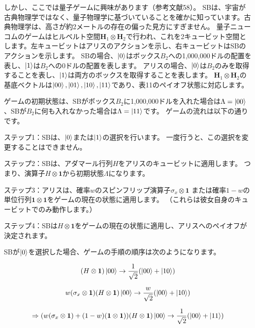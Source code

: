 しかし、ここでは量子ゲームに興味があります（参考文献58）。
SBは、宇宙が古典物理学ではなく、量子物理学に基づいていることを確かに知っています。古典物理学は、高さが約2メートルの存在の偏った見方にすぎません。
量子ニューコムのゲームはヒルベルト空間$\mathbf{H}_1 \otimes \mathbf{H}_2 $で行われ、これを2キュービット空間とします。左キュービットはアリスのアクションを示し、右キュービットはSBのアクションを示します。
  SBの場合、$\ket{0}$はボックス$B_2$への1,000,000ドルの配置を表し、$\ket{1}$は$B_2$への0ドルの配置を表します。 アリスの場合、$\ket{0}$は$B_2$のみを取得することを表し、$\ket{1}$は両方のボックスを取得することを表します。
$\mathbf{H}_1 \otimes \mathbf{H}_2 $の基底ベクトルは$\ket{00},\ket{01},\ket{10}, \ket{11}$であり、表11のペイオフ状態に対応します。

ゲームの初期状態は、SBがボックス$B_2$に1,000,000ドルを入れた場合は$ \Lambda = \ket{00}$、SBが$B_2$に何も入れなかった場合は$ \Lambda = \ket{11} $です。 ゲームの流れは以下の通りです。

ステップ1：SBは、$\ket{0}$または$\ket{1}$の選択を行います。 一度行うと、この選択を変更することはできません。

ステップ2：SBは、アダマール行列$H$をアリスのキュービットに適用します。 つまり、演算子$ H \otimes \mathbf{1} $から初期状態$\Lambda$になります。

ステップ3：アリスは、確率$w$のスピンフリップ演算子$ \sigma_x \otimes \mathbf{1}$ または確率$1 − w $の単位行列$\mathbf{1} \otimes \mathbf{1}$をゲームの現在の状態に適用します。 （これらは彼女自身のキュービットでのみ動作します。）

ステップ4：SBは$ H \otimes \mathbf{1}$をゲームの現在の状態に適用し、アリスへのペイオフが決定されます。

SBが$\ket{0}$を選択した場合、ゲームの手順の順序は次のようになります。


\begin{equation}
\label{164}
(H \otimes \mathbf{1}) \ket{00}
\to
\frac{1}{\sqrt{2}}
(\ket{00} + \ket{10})
\end{equation}

\begin{equation}
\label{165}
w(\sigma_x \otimes \mathbf{1})
(H \otimes \mathbf{1}) \ket{00}
\to
\frac{w}{\sqrt{2}}
(\ket{00} + \ket{10})
\end{equation}

\begin{equation}
\label{166}
\Rightarrow
(w( \sigma_x \otimes \mathbf{1}) + (1 - w)
(\mathbf{1} \otimes \mathbf{1}))(H \otimes \mathbf{1}) \ket{00}
\to
\frac{1}{\sqrt{2}}
(\ket{00} + \ket{11})
\end{equation}

